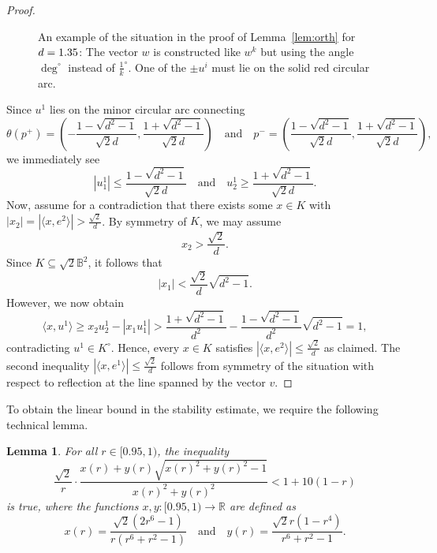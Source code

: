 \documentclass[12pt,a4paper]{article}
\newtheorem{lem}[twr]{Lemma}
\theoremstyle{definition}
\newcommand\R{\mathbb{R}}
\newcommand\B{\mathbb{B}}
\def\ds{1.5/\scale pt}
\begin{document}
\begin{proof}
\begin{figure}[ht]
%
\caption{
An example of the situation in the proof of Lemma~\ref{lem:orth} for $d = 1.35$:
The vector $w$ is constructed like $w^k$ but using the angle $\deg^\circ$ instead of $\frac{1}{k}^\circ$. One of the $\pm u^i$ must lie on the solid red circular arc.
}
%
\label{fig:stab_lem_rot}
\end{figure}



Since $u^1$ lies on the minor circular arc connecting
$$ \theta(p^+) = \left( - \frac{1 - \sqrt{d^2 - 1}}{\sqrt{2} d}, \frac{1 + \sqrt{d^2 - 1}}{\sqrt{2} d} \right)
\quad \text{and} \quad
p^- = \left( \frac{1 - \sqrt{d^2 - 1}}{\sqrt{2} d}, \frac{1 + \sqrt{d^2 - 1}}{\sqrt{2} d} \right), $$
we immediately see
$$ | u^1_1 | \leq \frac{1 - \sqrt{d^2 - 1}}{\sqrt{2} d}
\quad \text{and} \quad
u^1_2 \geq \frac{1 + \sqrt{d^2 - 1}}{\sqrt{2} d}. $$
Now, assume for a contradiction that there exists some $x \in K$ with $|x_2| = |\langle x, e^2 \rangle| > \frac{\sqrt{2}}{d}$. By symmetry of $K$, we may assume
$$ x_2 > \frac{\sqrt{2}}{d}. $$
Since $K \subseteq \sqrt{2} \B^2$, it follows that
$$ |x_1| < \frac{\sqrt{2}}{d} \sqrt{d^2 - 1}. $$
However, we now obtain
$$ \langle x, u^1 \rangle \geq x_2 u^1_2 - |x_1 u^1_1| > \frac{1 + \sqrt{d^2 - 1}}{d^2} - \frac{1 - \sqrt{d^2 - 1}}{d^2} \sqrt{d^2 - 1} = 1, $$
contradicting $u^1 \in K^\circ$. Hence, every $x \in K$ satisfies $|\langle x, e^2 \rangle| \leq \frac{\sqrt{2}}{d}$ as claimed. The second inequality $|\langle x, e^1 \rangle| \leq \frac{\sqrt{2}}{d}$ follows from symmetry of the situation with respect to reflection at the line spanned by the vector $v$.
\end{proof}



To obtain the linear bound in the stability estimate, we require the following technical lemma.



\begin{lem}
\label{lem:stab_poly_ineq}
For all $r \in [0.95,1)$, the inequality
$$ \frac{\sqrt{2}}{r} \cdot \frac{x(r) + y(r) \sqrt{x(r)^2 + y(r)^2 - 1}}{x(r)^2 + y(r)^2} < 1 + 10 (1 - r) $$
is true, where the functions $x, y \colon [0.95,1) \to \R$ are defined as
$$ x(r) = \frac{\sqrt{2} (2 r^6 - 1)}{r (r^6 + r^2 - 1)}
\quad \text{and} \quad
y(r) = \frac{\sqrt{2} r (1 - r^4)}{r^6 + r^2 - 1}. $$
\end{lem}
\end{document}

